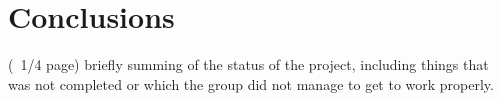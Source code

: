\section{Conclusions }
(~1/4 page) briefly summing of the status of the project, including things that was not completed or which the group did not manage to get to work properly.